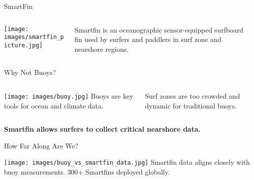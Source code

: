 \begin{frame}{SmartFin}
    \begin{columns}[c] 
        \begin{column}{0.5\textwidth}
            \centering
            \texttt{[image: images/smartfin\_picture.jpg]}
        \end{column}
        \begin{column}{0.5\textwidth}
            Smartfin is an oceanographic sensor-equipped surfboard fin used by surfers and paddlers in surf zone and nearshore regions.
        \end{column}
    \end{columns}
\end{frame}
\begin{frame}{Why Not Buoys?}
    \begin{columns}[c]
        \begin{column}{0.5\textwidth}
            \centering
            \texttt{[image: images/buoy.jpg]}
            \vspace{0.5em}
            {\small Buoys are key tools for ocean and climate data.}
        \end{column}
        \begin{column}{0.5\textwidth}
            \centering
            \vspace{0.5em}
            {\small Surf zones are too crowded and dynamic for traditional buoys.}
        \end{column}
    \end{columns}
    \vspace{1em}
    \begin{center}
    \textbf{Smartfin allows surfers to collect critical nearshore data.}
    \end{center}
\end{frame}
\begin{frame}{How Far Along Are We?}
    \begin{center}
        \texttt{[image: images/buoy\_vs\_smartfin\_data.jpg]}
        \vspace{1em}
        \small Smartfin data aligns closely with buoy measurements. 300+ Smartfins deployed globally.
    \end{center}
\end{frame}
